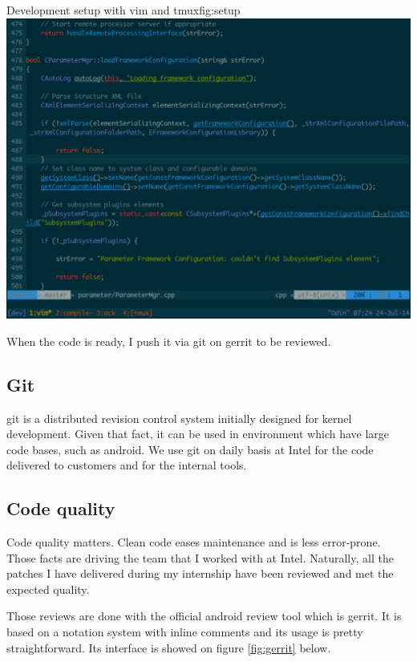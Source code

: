 \begin{figureGraphics}{Development setup with vim and tmux}{fig:setup}
\includegraphics[width=\textwidth]{./src/img/setup.pdf}
\end{figureGraphics}

When the code is ready, I push it via \gls{git} on \gls{gerrit} to be reviewed.

\subsection{Git}
\gls{git} is a distributed revision control system initially designed for kernel
development. Given that fact, it can be used in environment which have large
code bases, such as \gls{android}. We use \gls{git} on daily basis at Intel for the
code delivered to customers and for the internal tools.

\subsection{Code quality}
Code quality matters. Clean code eases maintenance and is less error-prone.
Those facts are driving the team that I worked with at Intel. Naturally, all the
patches I have delivered during my internship have been reviewed and met the
expected quality.

Those reviews are done with the official \gls{android} review tool which is \gls{gerrit}.
It is based on a notation system with inline comments and its usage is pretty straightforward.
Its interface is showed on figure \ref{fig:gerrit} below.

